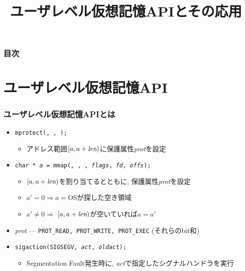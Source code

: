 \documentclass[12pt,dvipdfmx]{beamer}
\title{ユーザレベル仮想記憶APIとその応用}
\begin{document}
\maketitle

\begin{frame}
\frametitle{目次}
\tableofcontents
\end{frame}

\section{ユーザレベル仮想記憶API}

\begin{frame}
  \frametitle{ユーザレベル仮想記憶APIとは}
  \begin{itemize}
  \item {\tt mprotect(, , );}
    \begin{itemize}
    \item アドレス範囲$[a, a+\mbox{\it len})$に保護属性{\it prot}を設定
    \end{itemize}
  \item {\tt char * {\it a} = mmap(, , ,
      {\it flags}, {\it fd}, {\it offs});}
    \begin{itemize}
    \item $[a, a+\mbox{\it len})$を割り当てるとともに,
      保護属性{\it prot}を設定
    \item $a' = 0 \Rightarrow a = $OSが探した空き領域
    \item $a' \neq 0 \Rightarrow$
      $[a, a+\mbox{\it len})$が空いていれば$a = a'$
    \end{itemize}
  \item {\it prot} --- {\tt PROT\_READ, PROT\_WRITE, PROT\_EXEC} (それらのbit和)
  \item {\tt sigaction(SIGSEGV, {\it act}, {\it oldact});}
    \begin{itemize}
    \item Segmentation Fault発生時に, {\it act}で指定したシグナルハンドラを実行
    \end{itemize}
  \end{itemize}
\end{frame}
\end{document}
